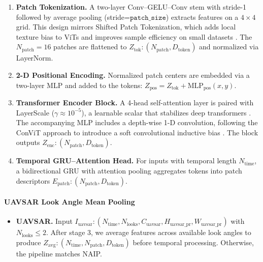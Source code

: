 \documentclass[preprints,article,accept,pdftex,moreauthors]{Definitions/mdpi}
\begin{document}
\begin{enumerate}[leftmargin=*]      
\item \textbf{Patch Tokenization.}  
      A two-layer Conv–GELU–Conv stem with stride-1 followed by average pooling (stride=$\texttt{patch\_size}$) extracts features on a $4\times4$ grid.  
      This design mirrors Shifted Patch Tokenization, which adds local texture bias to ViTs and improves sample efficiency on small datasets \cite{lee2021vision}.  
      The $N_{\text{patch}}=16$ patches are flattened to $Z_{\text{tok}}: (N_{\text{patch}}, D_{\text{token}})$ and normalized via LayerNorm.


\item \textbf{2-D Positional Encoding.}  
      Normalized patch centers are embedded via a two-layer MLP and added to the tokens:  
      $Z_{\text{pos}} = Z_{\text{tok}} + \text{MLP}_{\text{pos}}(x,y)$.

\item \textbf{Transformer Encoder Block.}  
      A 4-head self-attention layer is paired with LayerScale ($\gamma \approx 10^{-5}$), a learnable scalar that stabilizes deep transformers \cite{touvron2021going}.  
      The accompanying MLP includes a depth-wise 1-D convolution, following the ConViT approach to introduce a soft convolutional inductive bias \cite{dascoli2021convit}.  
      The block outputs $Z_{\text{enc}}: (N_{\text{patch}}, D_{\text{token}})$.


\item \textbf{Temporal GRU–Attention Head.}  
      For inputs with temporal length $N_{\text{time}}$, a bidirectional GRU with attention pooling aggregates tokens into patch descriptors $E_{\text{patch}}: (N_{\text{patch}}, D_{\text{token}})$.
\end{enumerate}

\paragraph{UAVSAR Look Angle Mean Pooling}
\begin{itemize}[leftmargin=*]
\item \textbf{UAVSAR.}  
      Input $I_{\text{uavsar}}: (N_{\text{time}}, N_{\text{looks}}, C_{\text{uavsar}}, H_{\text{uavsar\_pr}}, W_{\text{uavsar\_pr}})$ with $N_{\text{looks}} \leq 2$.  
      After stage 3, we average features across available look angles to produce $Z_{\text{avg}}: (N_{\text{time}}, N_{\text{patch}}, D_{\text{token}})$ before temporal processing.
      Otherwise, the pipeline matches NAIP.
\end{itemize}
\end{document}
